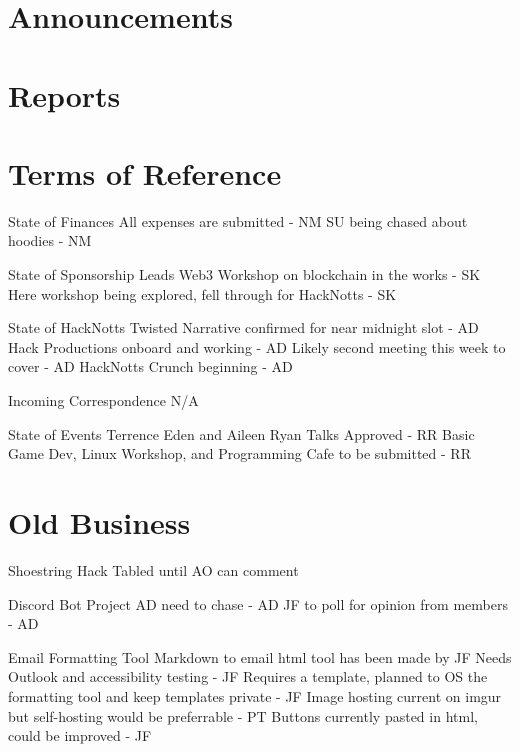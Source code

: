 \documentclass[11pt,hacksoc]{meetingmins}
\begin{document}
\maketitle

\section{Announcements}

\section{Reports}

\section{Terms of Reference}
\begin{items}
\item {State of Finances}
\subitem All expenses are submitted - NM
\subitem SU being chased about hoodies - NM
\item {State of Sponsorship Leads}
\subitem Web3 Workshop on blockchain in the works - SK
\subitem Here workshop being explored, fell through for HackNotts - SK
\item {State of HackNotts}
\subitem Twisted Narrative confirmed for near midnight slot - AD
\subitem Hack Productions onboard and working - AD
\subitem Likely second meeting this week to cover - AD
\subitem HackNotts Crunch beginning - AD
\item {Incoming Correspondence}
\subitem N/A
\item {State of Events}
\subitem Terrence Eden and Aileen Ryan Talks Approved - RR
\subitem Basic Game Dev, Linux Workshop, and Programming Cafe to be submitted - RR

\end{items}

\section{Old Business}
\begin{items}
\item Shoestring Hack
\subitem Tabled until AO can comment
\item Discord Bot Project
\subitem AD need to chase - AD
\subitem JF to poll for opinion from members - AD
\item Email Formatting Tool
\subitem Markdown to email html tool has been made by JF
\subitem Needs Outlook and accessibility testing - JF
\subitem Requires a template, planned to OS the formatting tool and keep templates private - JF
\subitem Image hosting current on imgur but self-hosting would be preferrable - PT
\subitem Buttons currently pasted in html, could be improved - JF
\end{items}
\end{document}
